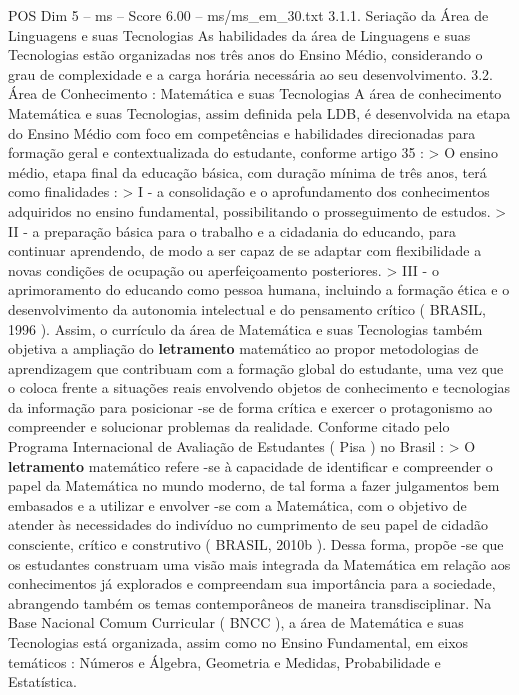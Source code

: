 \begin{textsample}{POS Dim 5 – ms – Score 6.00 – ms/ms\_em\_30.txt}  \label{ex:f5_pos_215}
3.1.1.
Seriação da Área de Linguagens e suas Tecnologias As habilidades da área de Linguagens e suas Tecnologias estão organizadas nos três anos do Ensino Médio, considerando o grau de complexidade e a carga horária necessária ao seu desenvolvimento. 3.2.
Área de Conhecimento : Matemática e suas Tecnologias A área de conhecimento Matemática e suas Tecnologias, assim definida pela LDB, é desenvolvida na etapa do Ensino Médio com foco em competências e habilidades direcionadas para formação geral e contextualizada do estudante, conforme artigo 35 : > O ensino médio, etapa final da educação básica, com duração mínima de três anos, terá como finalidades : > I - a consolidação e o aprofundamento dos conhecimentos adquiridos no ensino fundamental, possibilitando o prosseguimento de estudos. > II - a preparação básica para o trabalho e a cidadania do educando, para continuar aprendendo, de modo a ser capaz de se adaptar com flexibilidade a novas condições de ocupação ou aperfeiçoamento posteriores. > III - o aprimoramento do educando como pessoa humana, incluindo a formação ética e o desenvolvimento da autonomia intelectual e do pensamento crítico ( BRASIL, 1996 ).
Assim, o currículo da área de Matemática e suas Tecnologias também objetiva a ampliação do \textbf{letramento} matemático ao propor metodologias de aprendizagem que contribuam com a formação global do estudante, uma vez que o coloca frente a situações reais envolvendo objetos de conhecimento e tecnologias da informação para posicionar -se de forma crítica e exercer o protagonismo ao compreender e solucionar problemas da realidade.
Conforme citado pelo Programa Internacional de Avaliação de Estudantes ( Pisa ) no Brasil : > O \textbf{letramento} matemático refere -se à capacidade de identificar e compreender o papel da Matemática no mundo moderno, de tal forma a fazer julgamentos bem embasados e a utilizar e envolver -se com a Matemática, com o objetivo de atender às necessidades do indivíduo no cumprimento de seu papel de cidadão consciente, crítico e construtivo ( BRASIL, 2010b ).
Dessa forma, propõe -se que os estudantes construam uma visão mais integrada da Matemática em relação aos conhecimentos já explorados e compreendam sua importância para a sociedade, abrangendo também os temas contemporâneos de maneira transdisciplinar.
Na Base Nacional Comum Curricular ( BNCC ), a área de Matemática e suas Tecnologias está organizada, assim como no Ensino Fundamental, em eixos temáticos : Números e Álgebra, Geometria e Medidas, Probabilidade e Estatística.

\end{textsample}
